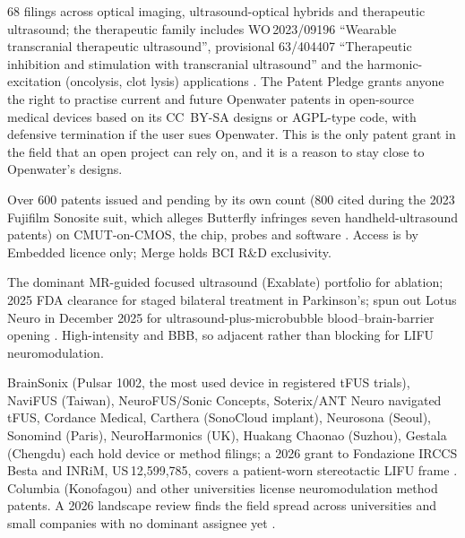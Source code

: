 \documentclass[11pt,a4paper]{article}
\begin{document}
\begin{description}[leftmargin=*]
\item[Openwater.] 68 filings across optical imaging, ultrasound-optical hybrids and therapeutic ultrasound; the therapeutic family includes WO\,2023/09196 ``Wearable transcranial therapeutic ultrasound'', provisional 63/404407 ``Therapeutic inhibition and stimulation with transcranial ultrasound'' and the harmonic-excitation (oncolysis, clot lysis) applications \cite{openwater_patents}. The Patent Pledge grants anyone the right to practise current and future Openwater patents in open-source medical devices based on its CC~BY-SA designs or AGPL-type code, with defensive termination if the user sues Openwater. This is the only patent grant in the field that an open project can rely on, and it is a reason to stay close to Openwater's designs.
\item[Butterfly Network.] Over 600 patents issued and pending by its own count (800 cited during the 2023 Fujifilm Sonosite suit, which alleges Butterfly infringes seven handheld-ultrasound patents) on CMUT-on-CMOS, the chip, probes and software \cite{bfly_ip}. Access is by Embedded licence only; Merge holds BCI R\&D exclusivity.
\item[Insightec.] The dominant MR-guided focused ultrasound (Exablate) portfolio for ablation; 2025 FDA clearance for staged bilateral treatment in Parkinson's; spun out Lotus Neuro in December 2025 for ultrasound-plus-microbubble blood--brain-barrier opening \cite{insightec}. High-intensity and BBB, so adjacent rather than blocking for LIFU neuromodulation.
\item[Research-device vendors and others.] BrainSonix (Pulsar 1002, the most used device in registered tFUS trials), NaviFUS (Taiwan), NeuroFUS/Sonic Concepts, Soterix/ANT Neuro navigated tFUS, Cordance Medical, Carthera (SonoCloud implant), Neurosona (Seoul), Sonomind (Paris), NeuroHarmonics (UK), Huakang Chaonao (Suzhou), Gestala (Chengdu) each hold device or method filings; a 2026 grant to Fondazione IRCCS Besta and INRiM, US\,12,599,785, covers a patient-worn stereotactic LIFU frame \cite{fusf_ip}. Columbia (Konofagou) and other universities license neuromodulation method patents. A 2026 landscape review finds the field spread across universities and small companies with no dominant assignee yet \cite{patsnap}.
\end{description}
\end{document}

